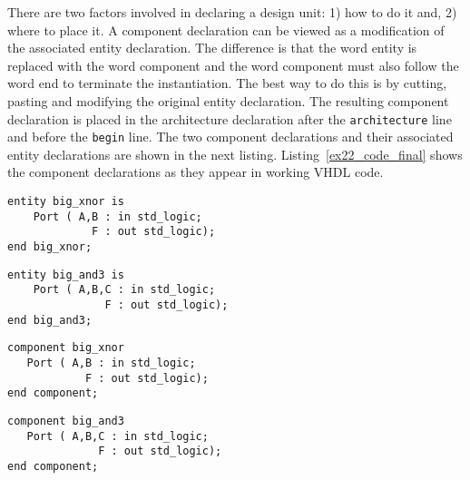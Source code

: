There are two factors involved in declaring a design unit: 1) how to do it and, 2) where to place it. A component declaration can be viewed as a modification of the associated entity declaration. The difference is that the word entity is replaced with the word component and the word component must also follow the word end to terminate the instantiation. The best way to do this is by cutting, pasting and modifying the original entity declaration. The resulting component declaration is placed in the architecture declaration after the \texttt{architecture} line and before the \texttt{begin} line. The two component declarations and their associated entity declarations are shown in the next listing. Listing~\ref{ex22_code_final} shows the component declarations as they appear in working VHDL code.

\begin{minipage}[t]{0.48\textwidth}
\vspace{0pt}
\noindent
\begin{lstlisting}[]
entity big_xnor is
    Port ( A,B : in std_logic;
             F : out std_logic);
end big_xnor;
\end{lstlisting}
\begin{lstlisting}[]
entity big_and3 is
    Port ( A,B,C : in std_logic;
               F : out std_logic);
end big_and3;
\end{lstlisting}
\end{minipage}
\begin{minipage}[t]{0.48\textwidth}
\vspace{0pt}\raggedright
\begin{lstlisting}[]
component big_xnor 
   Port ( A,B : in std_logic;
            F : out std_logic);
end component;
\end{lstlisting}
\begin{lstlisting}[]
component big_and3 
   Port ( A,B,C : in std_logic;
              F : out std_logic);
end component;
\end{lstlisting}
\end{minipage}

